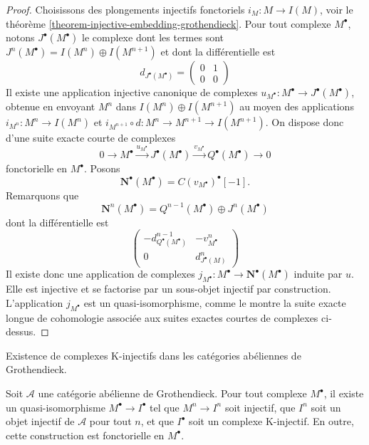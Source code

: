 \begin{proof}
Choisissons des plongements injectifs fonctoriels $i_M : M \to I(M)$, voir le
théorème \ref{theorem-injective-embedding-grothendieck}.
Pour tout complexe $M^\bullet$, notons $J^\bullet(M^\bullet)$ le complexe
dont les termes sont $J^n(M^\bullet) = I(M^n) \oplus I(M^{n + 1})$ et dont
la différentielle est
$$
d_{J^\bullet(M^\bullet)} =
\left(
\begin{matrix}
0 & 1 \\
0 & 0
\end{matrix}
\right)
$$
Il existe une application injective canonique de complexes
$u_{M^\bullet} : M^\bullet \to J^\bullet(M^\bullet)$, obtenue en envoyant
$M^n$ dans $I(M^n) \oplus I(M^{n + 1})$ au moyen des applications
$i_{M^n} : M^n \to I(M^n)$ et
$i_{M^{n + 1}} \circ d : M^n \to M^{n + 1} \to I(M^{n + 1})$. On dispose donc
d'une suite exacte courte de complexes
$$
0 \to M^\bullet \xrightarrow{u_{M^\bullet}}
J^\bullet(M^\bullet) \xrightarrow{v_{M^\bullet}}
Q^\bullet(M^\bullet) \to 0
$$
fonctorielle en $M^\bullet$. Posons
$$
\mathbf{N}^\bullet(M^\bullet) = C(v_{M^\bullet})^\bullet[-1].
$$
Remarquons que
$$
\mathbf{N}^n(M^\bullet) = Q^{n - 1}(M^\bullet) \oplus J^n(M^\bullet)
$$
dont la différentielle est
$$
\left(
\begin{matrix}
- d^{n - 1}_{Q^\bullet(M^\bullet)} & - v^n_{M^\bullet} \\
0 & d^n_{J^\bullet(M)}
\end{matrix}
\right)
$$
Il existe donc une application de complexes
$j_{M^\bullet} : M^\bullet \to \mathbf{N}^\bullet(M^\bullet)$ induite par $u$.
Elle est injective et se factorise par un sous-objet injectif par construction.
L'application $j_{M^\bullet}$ est un quasi-isomorphisme, comme le montre la
suite exacte longue de cohomologie associée aux suites exactes courtes de
complexes ci-dessus.
\end{proof}

\begin{theorem}
\label{theorem-K-injective-embedding-grothendieck}
\begin{slogan}
Existence de complexes K-injectifs dans les catégories abéliennes de
Grothendieck.
\end{slogan}
Soit $\mathcal{A}$ une catégorie abélienne de Grothendieck.
Pour tout complexe $M^\bullet$, il existe un quasi-isomorphisme
$M^\bullet \to I^\bullet$ tel que $M^n \to I^n$ soit injectif, que $I^n$
soit un objet injectif de $\mathcal{A}$ pour tout $n$, et que $I^\bullet$
soit un complexe K-injectif. En outre, cette construction est fonctorielle
en $M^\bullet$.
\end{theorem}

